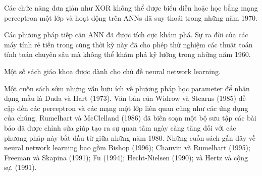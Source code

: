 Các chức năng đơn giản như XOR không thể được biểu diễn hoặc học bằng mạng perceptron một lớp và hoạt động trên ANNs đã suy thoái trong những năm 1970.

Các phương pháp tiếp cận ANN đã được tích cực khám phá. Sự ra đời của các máy tính rẻ tiền trong cùng thời kỳ này đã cho phép thử nghiệm các thuật toán tính toán chuyên sâu mà không thể khám phá kỹ lưỡng trong những năm 1960.

Một số sách giáo khoa được dành cho chủ đề neural network learning.

Một cuốn sách sớm nhưng vẫn hữu ích về phương pháp học parameter để nhận dạng mẫu là Duda và Hart (1973). Văn bản của Widrow và Stearns (1985) đề cập đến các perceptron và các mạng một lớp liên quan cũng như các ứng dụng của chúng. Rumelhart và McClelland (1986) đã biên soạn một bộ sưu tập các bài báo đã được chỉnh sửa giúp tạo ra sự quan tâm ngày càng tăng đối với các phương pháp này bắt đầu từ giữa những năm 1980. Những cuốn sách gần đây về neural network learning bao gồm Bishop (1996); Chauvin và Rumelhart (1995); Freeman và Skapina (1991); Fu (1994); Hecht-Nielsen (1990); và Hertz và cộng sự. (1991).

